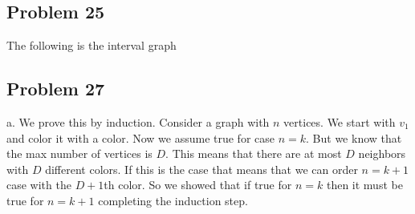 \documentclass[a4paper]{report}
\begin{document}
\subsection*{Problem 25}
The following is the interval graph
\begin{center}
\end{center}
\subsection*{Problem 27}
a. We prove this by induction. Consider a graph with $n$ vertices. We start with $v_1$ and color it with a color. Now we assume true for case $n = k$. But we know that the max number of vertices is $D$. This means that there are at most $D$ neighbors with $D$ different colors. If this is the case that means that we can order $n = k + 1$ case with  the $D + 1$th color. So we showed that if true for  $n = k$ then it must be true for $n = k + 1$ completing the induction step.
\end{document}
